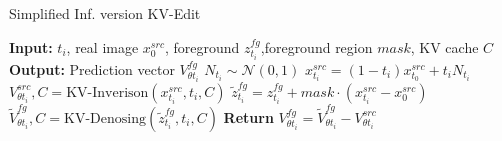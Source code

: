 \begin{algorithm}[t]
\caption{Simplified Inf. version KV-Edit}
\begin{algorithmic}[1]
\State \textbf{Input:} $t_{i}$, real image $x^{src}_0$, foreground $z^{fg}_{t_{i}}$,foreground region $mask$, KV cache $C$
\State \textbf{Output:} Prediction vector $V^{fg}_{\theta t_{i}}$
\State $N_{t_{i}}\sim\mathcal{N}(0,1)$
\State $x^{src}_{t_i} =(1-t_i)x^{src}_{t_0}+t_i N_{t_{i}}$
\State $V^{src}_{\theta t_{i}},C = \text{KV-Inverison}(x^{src}_{t_i}, t_{i},C)$
\State $\widetilde{z}^{fg}_{t_{i}} = z^{fg}_{t_{i}}+mask\cdot(x^{src}_{t_i}-x^{src}_0)$
\State $\widetilde{V}^{fg}_{\theta t_{i}},C = \text{KV-Denosing}(\widetilde{z}^{fg}_{t_{i}}, t_{i},C)$
\State \textbf{Return} $V^{fg}_{\theta t_{i}} = \widetilde{V}^{fg}_{\theta t_{i}} - V^{src}_{\theta t_{i}}$
\end{algorithmic}
\label{algorithm:algorithm3}
\end{algorithm}
